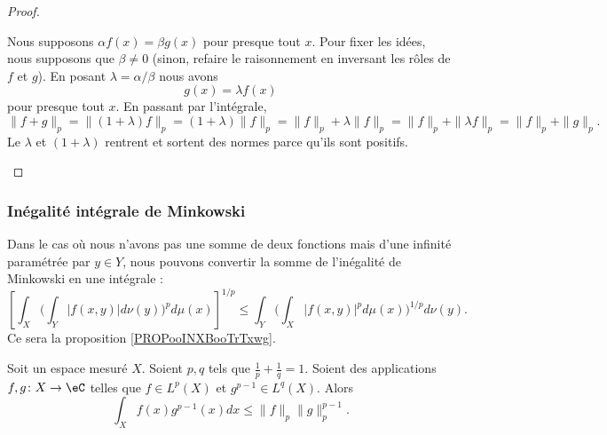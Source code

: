 \begin{proof}
\begin{subproof}
\begin{subproof}
			\spitem[\( \Leftarrow\)]
			Nous supposons \( \alpha f(x)=\beta g(x)\) pour presque tout \( x\). Pour fixer les idées, nous supposons que \( \beta\neq 0\) (sinon, refaire le raisonnement en inversant les rôles de \( f\) et \( g\)). En posant \( \lambda=\alpha/\beta\) nous avons
			\begin{equation}
				g(x)=\lambda f(x)
			\end{equation}
			pour presque tout \( x\). En passant par l'intégrale,
			\begin{equation}
				\| f+g \|_p=\| (1+\lambda)f \|_p=(1+\lambda)\| f \|_p=\| f \|_p+\lambda\| f \|_p=\| f \|_p+\| \lambda f \|_p=\| f \|_p+\| g \|_p.
			\end{equation}
			Le \( \lambda\) et \( (1+\lambda)\) rentrent et sortent des normes parce qu'ils sont positifs.
		\end{subproof}
	\end{subproof}
\end{proof}


\subsubsection{Inégalité intégrale de Minkowski}


Dans le cas où nous n'avons pas une somme de deux fonctions mais d'une infinité paramétrée par \( y\in Y\), nous pouvons convertir la somme de l'inégalité de Minkowski en une intégrale :
\begin{equation}
	\left[ \int_X\Big( \int_Y| f(x,y) |d\nu(y) \Big)^pd\mu(x) \right]^{1/p}\leq \int_Y\Big( \int_X| f(x,y) |^pd\mu(x) \Big)^{1/p}d\nu(y).
\end{equation}
Ce sera la proposition \ref{PROPooINXBooTrTxwg}.

\begin{lemma}	\label{LEMooMZWYooIsJJms}
	Soit un espace mesuré \( X\). Soient \( p,q\) tels que \( \frac{1}{ p}+\frac{1}{ q}=1\). Soient des applications \(f,g \colon X\to \eC  \) telles que \( f\in L^p(X)\) et \( g^{p-1}\in L^q(X)\). Alors
	\begin{equation}
		\int_Xf(x)g^{p-1}(x)dx\leq\| f \|_p\| g \|_p^{p-1}.
	\end{equation}
\end{lemma}

